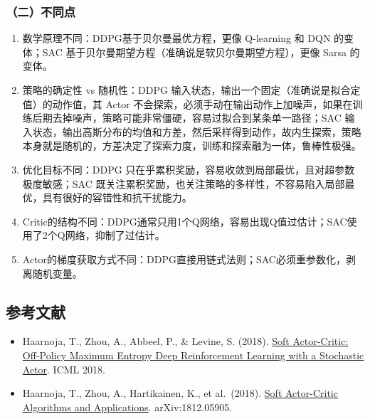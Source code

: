 \hypertarget{ux4e8cux4e0dux540cux70b9}{%
\subsubsection{（二）不同点}\label{ux4e8cux4e0dux540cux70b9}}

\begin{enumerate}
\def\labelenumi{\arabic{enumi}.}
\item
  数学原理不同：DDPG基于贝尔曼最优方程，更像 Q-learning 和 DQN 的变体；SAC 基于贝尔曼期望方程（准确说是软贝尔曼期望方程），更像 Sarsa 的变体。
\item
  策略的确定性 vs 随机性：DDPG 输入状态，输出一个固定（准确说是拟合定值）的动作值，其 Actor 不会探索，必须手动在输出动作上加噪声，如果在训练后期去掉噪声，策略可能非常僵硬，容易过拟合到某条单一路径；SAC 输入状态，输出高斯分布的均值和方差，然后采样得到动作，故内生探索，策略本身就是随机的，方差决定了探索力度，训练和探索融为一体，鲁棒性极强。
\item
  优化目标不同：DDPG 只在乎累积奖励，容易收敛到局部最优，且对超参数极度敏感；SAC 既关注累积奖励，也关注策略的多样性，不容易陷入局部最优，具有很好的容错性和抗干扰能力。
\item
  Critic的结构不同：DDPG通常只用1个Q网络，容易出现Q值过估计；SAC使用了2个Q网络，抑制了过估计。
\item
  Actor的梯度获取方式不同：DDPG直接用链式法则；SAC必须重参数化，剥离随机变量。
\end{enumerate}

\FloatBarrier
{}
\hypertarget{ux53c2ux8003ux6587ux732e-61}{%
\subsection{参考文献}\label{ux53c2ux8003ux6587ux732e-61}}

\vspace{0.25em}
\begin{itemize}
\tightlist
\item
  Haarnoja, T., Zhou, A., Abbeel, P., \& Levine, S. (2018). \href{https://arxiv.org/abs/1801.01290}{Soft Actor-Critic: Off-Policy Maximum Entropy Deep Reinforcement Learning with a Stochastic Actor}. ICML 2018.
\item
  Haarnoja, T., Zhou, A., Hartikainen, K., et al.~(2018). \href{https://arxiv.org/abs/1812.05905}{Soft Actor-Critic Algorithms and Applications}. arXiv:1812.05905.
\end{itemize}

\clearpage
